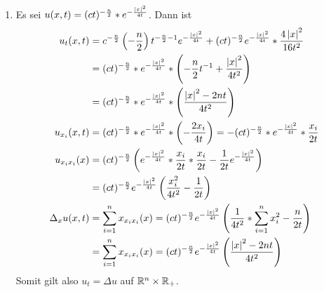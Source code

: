 \begin{exercisePage}
	\begin{enumerate}[label=(zu \alph*), leftmargin=*]
		\item Es sei $u(x,t) = (ct)^{-\frac{n}{2}} * e^{- \frac{\left| x \right|^2}{4t}}$. Dann ist
		\begin{align*}
			u_t(x, t) &= c^{-\frac{n}{2}} \left( - \frac{n}{2} \right) t^{-\frac{n}{2} - 1} e^{-\frac{\left| x \right|^2}{4t}} + (ct)^{-\frac{n}{2}} e^{- \frac{\left| x \right|^2}{4t}} * \frac{4 \left| x \right|^2}{16 t^2} \\
			&= (ct)^{-\frac{n}{2}} * e^{- \frac{\left| x \right|^2}{4t}} * \left( - \frac{n}{2} t^{-1} + \frac{\left| x \right|^2}{4t^2} \right) \\
			&= (ct)^{-\frac{n}{2}} * e^{- \frac{\left| x \right|^2}{4t}} * \left( \frac{\left| x \right|^2 - 2nt}{4t^2} \right) \\
			u_{x_i}(x,t) &= (ct)^{-\frac{n}{2}} * e^{- \frac{\left| x \right|^2}{4t}} * \left( -\frac{2x_i}{4t} \right) = - (ct)^{-\frac{n}{2}} * e^{- \frac{\left| x \right|^2}{4t}} * \frac{x_i}{2t} \\
			u_{x_i x_i}(x) &= (ct)^{-\frac{n}{2}} \left( e^{- \frac{\left| x \right|^2}{4t}} * \frac{x_i}{2t} * \frac{x_i}{2t} - \frac{1}{2t} e^{- \frac{\left| x \right|^2}{4t}} \right) \\
			&= (ct)^{-\frac{n}{2}} e^{- \frac{\left| x \right|^2}{4t}} \left(  \frac{x_i^2}{4t^2} - \frac{1}{2t} \right) \\
			\Delta_x u(x,t) &= \sum_{i=1}^n x_{x_i x_i}(x)  
			= (ct)^{-\frac{n}{2}} e^{- \frac{\left| x \right|^2}{4t}} \left( \frac{1}{4t^2} * \sum_{i=1}^n x_i^2 - \frac{n}{2t} \right) \\
			&= \sum_{i=1}^n x_{x_i x_i}(x)  
			= (ct)^{-\frac{n}{2}} e^{- \frac{\left| x \right|^2}{4t}} \left( \frac{\left| x \right|^2 - 2nt}{4t^2} \right)
		\end{align*}
		Somit gilt also $u_t = \Delta u$ auf $\mathbb{R}^n \times \mathbb{R}_+$.
		

\end{enumerate}
\end{exercisePage}

